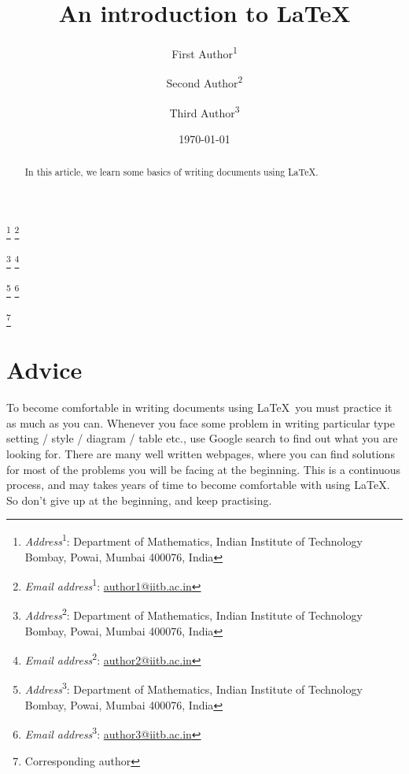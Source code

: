 \documentclass[11pt,leqno]{amsart}
\makeatletter
\numberwithin{equation}{subsection}
\theoremstyle{definition}
\newenvironment{nouppercase}{%
	\let\uppercase\relax%
	\renewcommand{\uppercasenonmath}[1]{}}{}
\newcommand\thankssymb[1]{\textsuperscript{\@fnsymbol{#1}}}
\newcommand\thanksnum[1]{\textsuperscript{#1}}
\renewcommand{\email}[2][1]{\thanks{\textit{Email address}#1: \href{mailto:#2}{#2}}}
\renewcommand{\address}[2][1]{\thanks{\textit{Address}#1: #2}}
\newcommand{\corauth}[2][]{\thanks{#2Corresponding author}}
\makeatother
\begin{document}
\baselineskip=15.5pt

\title[Basics of \LaTeX]{An introduction to \LaTeX} 

\author[F. Author]{\large First Author\thanksnum{1}\thankssymb{1}}
\address[\thanksnum{1}]{Department of Mathematics, Indian Institute of Technology Bombay, Powai, Mumbai 400076, India}
\email[\thanksnum{1}]{author1@iitb.ac.in}

\author[S. Author]{Second Author\thanksnum{2}} 
\address[\thanksnum{2}]{Department of Mathematics, Indian Institute of Technology Bombay, Powai, Mumbai 400076, India}
\email[\thanksnum{2}]{author2@iitb.ac.in}

\author[T. Author]{Third Author\thanksnum{3}} 
\address[\thanksnum{3}]{Department of Mathematics, Indian Institute of Technology Bombay, Powai, Mumbai 400076, India}
\email[\thanksnum{3}]{author3@iitb.ac.in}

\corauth[]{\thankssymb{1}} 


\keywords{\LaTeX} 

\date{\today}


\begin{nouppercase}
	\maketitle
\end{nouppercase}

\tableofcontents

\begin{abstract}
In this article, we learn some basics of writing documents using \LaTeX. 
\end{abstract}


\section{Advice} 
To become comfortable in writing documents using \LaTeX\, you must practice it as much as you can. 
Whenever you face some problem in writing particular type setting / style / diagram / table etc., 
use Google search to find out what you are looking for. There are many well written webpages, 
where you can find solutions for most of the problems you will be facing at the beginning. 
This is a continuous process, and may takes years of time to become comfortable with using \LaTeX. 
So don't give up at the beginning, and keep practising. 
\end{document}
